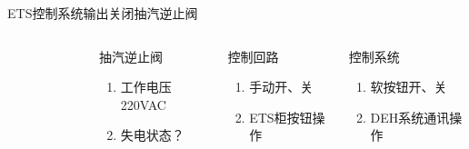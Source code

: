 \documentclass[12pt,hyperref={CJKbookmarks=true}]{beamer} %
\begin{document}
\begin{frame}{ETS控制系统输出}{关闭抽汽逆止阀}
\begin{columns}
\begin{figure}
\end{figure}
\begin{block}{抽汽逆止阀}
			\begin{enumerate}
				\item  工作电压220VAC
				\item  失电状态？
				\end{enumerate}
\end{block}
\begin{exampleblock}{控制回路}
			\begin{enumerate}
				\item 手动开、关
				\item ETS柜按钮操作
				\end{enumerate}
\end{exampleblock}
\begin{alertblock}{控制系统}
				\begin{enumerate}
				\item 软按钮开、关
				\item DEH系统通讯操作
				\end{enumerate}
\end{alertblock}
		\end{columns}
	\end{frame}
\end{document}

